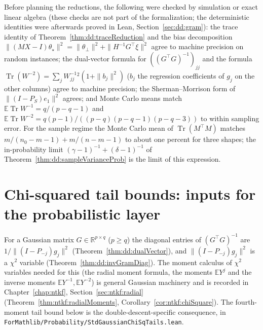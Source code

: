 \begin{remark}\label{rmk:dd:numerics}
Before planning the reductions, the following were checked by simulation or exact linear algebra (these checks are not part of the formalization; the deterministic identities were afterwards proved in Lean, Section~\ref{sec:dd:gram}): the
trace identity of Theorem~\ref{thm:dd:traceReduction} and the bias decomposition $\|(MX-I)\theta_\star\|^2=\|\theta_\perp\|^2+\|H^{-1}G^\top\xi\|^2$
agree to machine precision on random instances; the dual-vector formula for $((G^\top G)^{-1})_{jj}$ and the formula
$\operatorname{Tr}(W^{-2})=\sum_jW^{-1}_{jj}{}^2(1+\|b_j\|^2)$ ($b_j$ the regression coefficients of $g_j$ on the other columns) agree to machine precision; the Sherman--Morrison form
of $\|(I-P_S)e_1\|^2$ agrees; and Monte Carlo means match $\mathbb E\operatorname{Tr}W^{-1}=q/(p-q-1)$ and
$\mathbb E\operatorname{Tr}W^{-2}=q(p-1)/((p-q)(p-q-1)(p-q-3))$ to within sampling error. For the sample regime the Monte Carlo mean of
$\operatorname{Tr}(M^\top M)$ matches $m/(n_0-m-1)+m/(n-m-1)$ to about one percent for three shapes; the in-probability limit $(\gamma-1)^{-1}+(\delta-1)^{-1}$ of Theorem~\ref{thm:dd:sampleVarianceProb} is the limit of this expression.
\end{remark}


\section{Chi-squared tail bounds: inputs for the probabilistic layer}\label{sec:dd:moments}

For a Gaussian matrix $G\in\mathbb R^{p\times q}$ ($p\ge q$) the diagonal entries of $(G^\top G)^{-1}$ are
$1/\|(I-P_{-j})g_j\|^2$ (Theorem~\ref{thm:dd:dualVector}), and $\|(I-P_{-j})g_j\|^2$ is a $\chi^2$ variable (Theorem~\ref{thm:dd:invGramDiag}). The moment calculus of
$\chi^2$ variables needed for this (the radial moment formula, the moments $\mathbb EY^j$ and the inverse moments $\mathbb EY^{-1},\mathbb EY^{-2}$) is
general Gaussian machinery and is recorded in Chapter~\ref{chap:ntkf}, Section~\ref{sec:ntkf:radial}
(Theorem~\ref{thm:ntkf:radialMoments}, Corollary~\ref{cor:ntkf:chiSquare}). The fourth-moment tail bound below is the double-descent-specific
consequence, in \texttt{ForMathlib/Probability/StdGaussianChiSqTails.lean}.

